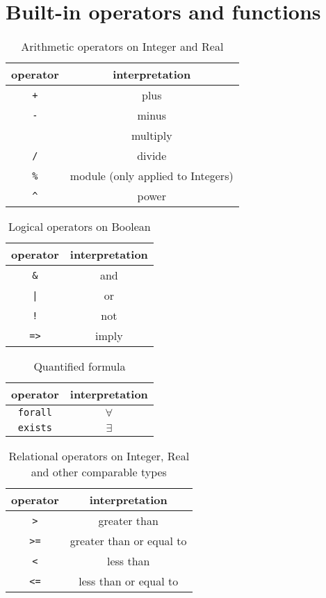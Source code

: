 \documentclass[12pt]{article}
\begin{document}
\appendix

\section{Built-in operators and functions}
\begin{table}[h]
\centering
\caption{Arithmetic operators on Integer and Real}
\begin{tabular}{ c c }
\toprule 
operator & interpretation \\
\midrule
{\tt +} & plus \\ 
{\tt -} & minus \\ 
{\tt *} & multiply \\
{\tt /} & divide \\ 
{\tt \%} & module (only applied to Integers) \\
\verb|^| & power \\
\bottomrule
\end{tabular}
\end{table}

\begin{table}[h]
\centering
\caption{Logical operators on Boolean}
\begin{tabular}{ c c }
\toprule 
operator & interpretation \\
\midrule
{\tt \&} & and \\ 
{\tt |} & or \\ 
{\tt !} & not \\
{\tt =>} & imply \\
\bottomrule
\end{tabular}
\end{table}

\begin{table}[h]
\centering
\caption{Quantified formula}
\begin{tabular}{ c c }
\toprule 
operator & interpretation \\
\midrule
{\tt forall} & $\forall$ \\ 
{\tt exists} & $\exists$ \\ 
\bottomrule
\end{tabular}
\end{table}

\begin{table}[h]
\centering
\caption{Relational operators on Integer, Real and other comparable types}
\begin{tabular}{ c c }
\toprule 
operator & interpretation \\
\midrule
{\tt >} & greater than \\ 
{\tt >=} & greater than or equal to \\ 
{\tt <} & less than \\
{\tt <=} & less than or equal to \\
\bottomrule
\end{tabular}
\end{table}
\end{document}
